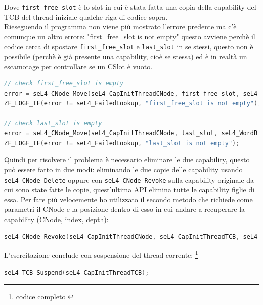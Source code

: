 Dove \texttt{first\_free\_slot} è lo slot in cui è stata fatta una copia della capability del TCB del thread iniziale qualche riga di codice sopra.\\
Rieseguendo il programma non viene più mostrato l'errore predente ma c'è comunque un altro errore: "first\_free\_slot is not empty" questo avviene perchè il codice cerca di spostare \texttt{first\_free\_slot} e \texttt{last\_slot} in se stessi, questo non è possibile (perchè è già presente una capability, cioè se stessa) ed è in realtà un escamotage per controllare se un CSlot è vuoto.
\begin{lstlisting}[language=C++]           
// check first_free_slot is empty
error = seL4_CNode_Move(seL4_CapInitThreadCNode, first_free_slot, seL4_WordBits, seL4_CapInitThreadCNode, first_free_slot, seL4_WordBits);
ZF_LOGF_IF(error != seL4_FailedLookup, "first_free_slot is not empty");

// check last_slot is empty
error = seL4_CNode_Move(seL4_CapInitThreadCNode, last_slot, seL4_WordBits, seL4_CapInitThreadCNode, last_slot, seL4_WordBits);
ZF_LOGF_IF(error != seL4_FailedLookup, "last_slot is not empty");
\end{lstlisting}
Quindi per risolvere il problema è necessario eliminare le due capability, questo può essere fatto in due modi: eliminando le due copie delle capability usando \texttt{seL4\_CNode\_Delete} oppure con \texttt{seL4\_CNode\_Revoke} sulla capability originale da cui sono state fatte le copie, quest'ultima API elimina tutte le capability figlie di essa. Per fare più velocemente ho utilizzato il secondo metodo che richiede come parametri il CNode e la posizione dentro di esso in cui andare a recuperare la capability (CNode, index, depth):
\begin{lstlisting}[language=C++]
seL4_CNode_Revoke(seL4_CapInitThreadCNode, seL4_CapInitThreadTCB, seL4_WordBits);
\end{lstlisting}
L'esercitazione conclude con sospensione del thread corrente: \footnote{codice completo \cite{capability}}
\begin{lstlisting}[language=C++]
seL4_TCB_Suspend(seL4_CapInitThreadTCB);
\end{lstlisting}

